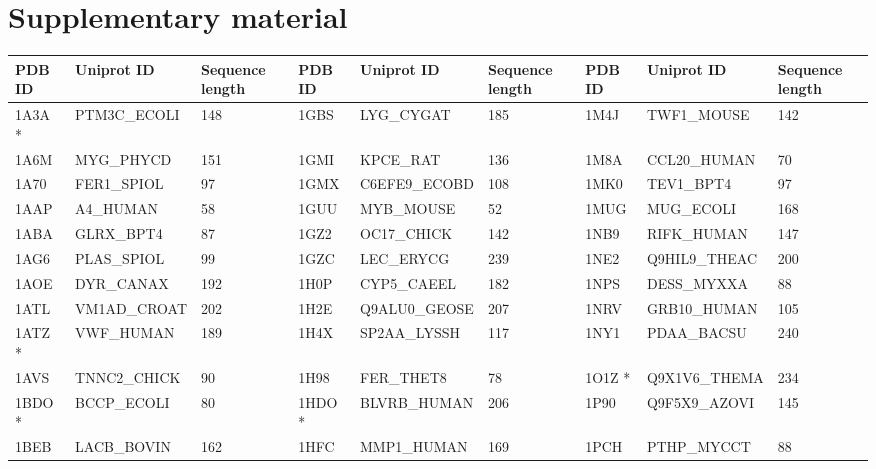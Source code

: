 \documentclass{bioinfo}
\begin{document}
\section{Supplementary material}
\begin{table}[!t]
{\begin{tabular}{lllllllll}\toprule
    PDB ID & Uniprot ID   & Sequence length & PDB ID & Uniprot ID   & Sequence length & PDB ID & Uniprot ID   & Sequence length \\ \midrule
    1A3A *  & PTM3C\_ECOLI & 148             & 1GBS   & LYG\_CYGAT   & 185             & 1M4J   & TWF1\_MOUSE  & 142             \\
    1A6M   & MYG\_PHYCD   & 151             & 1GMI   & KPCE\_RAT    & 136             & 1M8A   & CCL20\_HUMAN & 70              \\
    1A70   & FER1\_SPIOL  & 97              & 1GMX   & C6EFE9\_ECOBD & 108             & 1MK0   & TEV1\_BPT4   & 97              \\
    1AAP   & A4\_HUMAN    & 58              & 1GUU   & MYB\_MOUSE   & 52              & 1MUG   & MUG\_ECOLI   & 168             \\
    1ABA   & GLRX\_BPT4   & 87              & 1GZ2   & OC17\_CHICK  & 142             & 1NB9   & RIFK\_HUMAN  & 147             \\
    1AG6   & PLAS\_SPIOL  & 99              & 1GZC   & LEC\_ERYCG   & 239             & 1NE2   & Q9HIL9\_THEAC & 200             \\
    1AOE   & DYR\_CANAX   & 192             & 1H0P   & CYP5\_CAEEL  & 182             & 1NPS   & DESS\_MYXXA  & 88              \\
    1ATL   & VM1AD\_CROAT & 202             & 1H2E   & Q9ALU0\_GEOSE & 207             & 1NRV   & GRB10\_HUMAN & 105             \\
    1ATZ *  & VWF\_HUMAN   & 189             & 1H4X   & SP2AA\_LYSSH & 117             & 1NY1   & PDAA\_BACSU  & 240             \\
    1AVS   & TNNC2\_CHICK & 90              & 1H98   & FER\_THET8   & 78              & 1O1Z *  & Q9X1V6\_THEMA & 234             \\
    1BDO *  & BCCP\_ECOLI  & 80              & 1HDO *  & BLVRB\_HUMAN & 206             & 1P90   & Q9F5X9\_AZOVI & 145             \\
    1BEB   & LACB\_BOVIN  & 162             & 1HFC   & MMP1\_HUMAN  & 169             & 1PCH   & PTHP\_MYCCT  & 88              \\

\end{tabular}}
\end{table}
\end{document}

